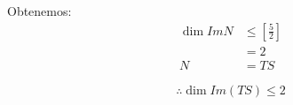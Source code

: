 \documentclass{article}
\begin{document}
\begin{enumerate}
			Obtenemos:
			\begin{equation*}
				\begin{aligned}
					\dim Im N &\leq \left[\frac{5}{2}\right] \\
							  &= 2 \\
					N 		  &= TS
				\end{aligned}
			\end{equation*}
		\end{enumerate}
		\[
		\boxed{\therefore \dim Im(TS) \leq 2}
		\]
		
	
\end{document}
